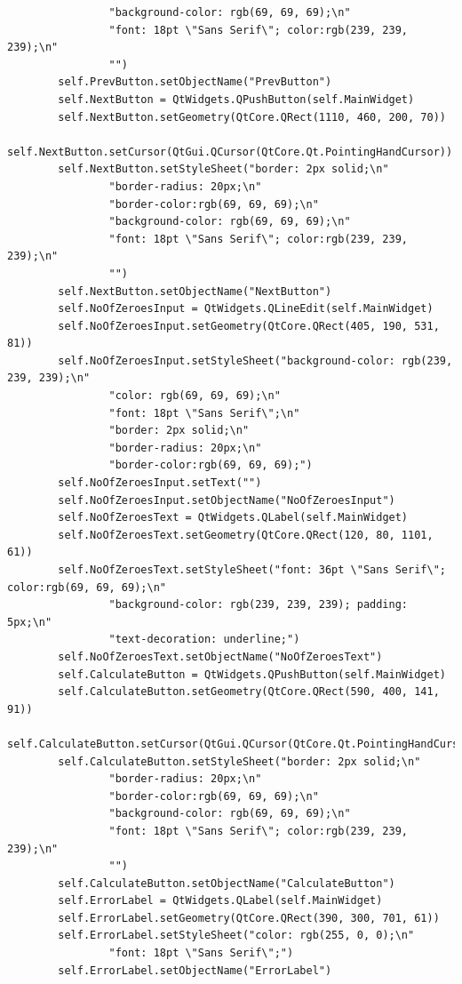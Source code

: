 \documentclass{article}
\begin{document}
\begin{lstlisting}
                "background-color: rgb(69, 69, 69);\n"
                "font: 18pt \"Sans Serif\"; color:rgb(239, 239, 239);\n"
                "")
        self.PrevButton.setObjectName("PrevButton")
        self.NextButton = QtWidgets.QPushButton(self.MainWidget)
        self.NextButton.setGeometry(QtCore.QRect(1110, 460, 200, 70))
        self.NextButton.setCursor(QtGui.QCursor(QtCore.Qt.PointingHandCursor))
        self.NextButton.setStyleSheet("border: 2px solid;\n"
                "border-radius: 20px;\n"
                "border-color:rgb(69, 69, 69);\n"
                "background-color: rgb(69, 69, 69);\n"
                "font: 18pt \"Sans Serif\"; color:rgb(239, 239, 239);\n"
                "")
        self.NextButton.setObjectName("NextButton")
        self.NoOfZeroesInput = QtWidgets.QLineEdit(self.MainWidget)
        self.NoOfZeroesInput.setGeometry(QtCore.QRect(405, 190, 531, 81))
        self.NoOfZeroesInput.setStyleSheet("background-color: rgb(239, 239, 239);\n"
                "color: rgb(69, 69, 69);\n"
                "font: 18pt \"Sans Serif\";\n"
                "border: 2px solid;\n"
                "border-radius: 20px;\n"
                "border-color:rgb(69, 69, 69);")
        self.NoOfZeroesInput.setText("")
        self.NoOfZeroesInput.setObjectName("NoOfZeroesInput")
        self.NoOfZeroesText = QtWidgets.QLabel(self.MainWidget)
        self.NoOfZeroesText.setGeometry(QtCore.QRect(120, 80, 1101, 61))
        self.NoOfZeroesText.setStyleSheet("font: 36pt \"Sans Serif\"; color:rgb(69, 69, 69);\n"
                "background-color: rgb(239, 239, 239); padding: 5px;\n"
                "text-decoration: underline;")
        self.NoOfZeroesText.setObjectName("NoOfZeroesText")
        self.CalculateButton = QtWidgets.QPushButton(self.MainWidget)
        self.CalculateButton.setGeometry(QtCore.QRect(590, 400, 141, 91))
        self.CalculateButton.setCursor(QtGui.QCursor(QtCore.Qt.PointingHandCursor))
        self.CalculateButton.setStyleSheet("border: 2px solid;\n"
                "border-radius: 20px;\n"
                "border-color:rgb(69, 69, 69);\n"
                "background-color: rgb(69, 69, 69);\n"
                "font: 18pt \"Sans Serif\"; color:rgb(239, 239, 239);\n"
                "")
        self.CalculateButton.setObjectName("CalculateButton")
        self.ErrorLabel = QtWidgets.QLabel(self.MainWidget)
        self.ErrorLabel.setGeometry(QtCore.QRect(390, 300, 701, 61))
        self.ErrorLabel.setStyleSheet("color: rgb(255, 0, 0);\n"
                "font: 18pt \"Sans Serif\";")
        self.ErrorLabel.setObjectName("ErrorLabel")


\end{lstlisting}
\end{document}
